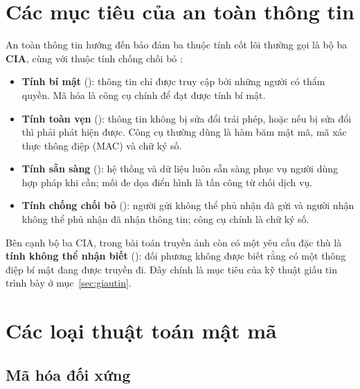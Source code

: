 \section{Các mục tiêu của an toàn thông tin}

An toàn thông tin hướng đến bảo đảm ba thuộc tính cốt lõi thường gọi là bộ ba \textbf{CIA},
cùng với thuộc tính chống chối bỏ \cite{stallings2020}:
\begin{itemize}
  \item \textbf{Tính bí mật} (): thông tin chỉ được truy cập bởi những
        người có thẩm quyền. Mã hóa là công cụ chính để đạt được tính bí mật.
  \item \textbf{Tính toàn vẹn} (): thông tin không bị sửa đổi trái phép, hoặc
        nếu bị sửa đổi thì phải phát hiện được. Công cụ thường dùng là hàm băm mật mã, mã xác
        thực thông điệp (MAC) và chữ ký số.
  \item \textbf{Tính sẵn sàng} (): hệ thống và dữ liệu luôn sẵn sàng phục
        vụ người dùng hợp pháp khi cần; mối đe dọa điển hình là tấn công từ chối dịch vụ.
  \item \textbf{Tính chống chối bỏ} (): người gửi không thể phủ nhận đã
        gửi và người nhận không thể phủ nhận đã nhận thông tin; công cụ chính là chữ ký số.
\end{itemize}

Bên cạnh bộ ba CIA, trong bài toán truyền ảnh còn có một yêu cầu đặc thù là \textbf{tính
không thể nhận biết} (): đối phương không được biết rằng có một thông
điệp bí mật đang được truyền đi. Đây chính là mục tiêu của kỹ thuật giấu tin trình bày ở
mục~\ref{sec:giautin}.

\section{Các loại thuật toán mật mã}

\subsection{Mã hóa đối xứng}

